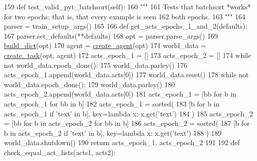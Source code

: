 \begin{DoxyCode}
159     \textcolor{keyword}{def }test\_valid\_pyt\_batchsort(self):
160         \textcolor{stringliteral}{"""}
161 \textcolor{stringliteral}{        Tests that batchsort *works* for two epochs; that is, that every example is seen}
162 \textcolor{stringliteral}{        both epochs.}
163 \textcolor{stringliteral}{        """}
164         parser = train\_setup\_args()
165 
166         \textcolor{keyword}{def }get\_acts\_epochs\_1\_and\_2(defaults):
167             parser.set\_defaults(**defaults)
168             opt = parser.parse\_args()
169             \hyperlink{namespacebuild__dict}{build\_dict}(opt)
170             agent = \hyperlink{namespaceparlai_1_1core_1_1agents_a00d77a7e26fb89e8bd900f7b2a02982a}{create\_agent}(opt)
171             world\_data = \hyperlink{namespaceparlai_1_1core_1_1worlds_a79969c7ba76d4b3c500f5bb776444dc6}{create\_task}(opt, agent)
172             acts\_epoch\_1 = []
173             acts\_epoch\_2 = []
174             \textcolor{keywordflow}{while} \textcolor{keywordflow}{not} world\_data.epoch\_done():
175                 world\_data.parley()
176                 acts\_epoch\_1.append(world\_data.acts[0])
177             world\_data.reset()
178             \textcolor{keywordflow}{while} \textcolor{keywordflow}{not} world\_data.epoch\_done():
179                 world\_data.parley()
180                 acts\_epoch\_2.append(world\_data.acts[0])
181             acts\_epoch\_1 = [bb \textcolor{keywordflow}{for} b \textcolor{keywordflow}{in} acts\_epoch\_1 \textcolor{keywordflow}{for} bb \textcolor{keywordflow}{in} b]
182             acts\_epoch\_1 = sorted(
183                 [b \textcolor{keywordflow}{for} b \textcolor{keywordflow}{in} acts\_epoch\_1 \textcolor{keywordflow}{if} \textcolor{stringliteral}{'text'} \textcolor{keywordflow}{in} b], key=\textcolor{keyword}{lambda} x: x.get(\textcolor{stringliteral}{'text'})
184             )
185             acts\_epoch\_2 = [bb \textcolor{keywordflow}{for} b \textcolor{keywordflow}{in} acts\_epoch\_2 \textcolor{keywordflow}{for} bb \textcolor{keywordflow}{in} b]
186             acts\_epoch\_2 = sorted(
187                 [b \textcolor{keywordflow}{for} b \textcolor{keywordflow}{in} acts\_epoch\_2 \textcolor{keywordflow}{if} \textcolor{stringliteral}{'text'} \textcolor{keywordflow}{in} b], key=\textcolor{keyword}{lambda} x: x.get(\textcolor{stringliteral}{'text'})
188             )
189             world\_data.shutdown()
190             \textcolor{keywordflow}{return} acts\_epoch\_1, acts\_epoch\_2
191 
192         \textcolor{keyword}{def }check\_equal\_act\_lists(acts1, acts2):

\end{DoxyCode}
